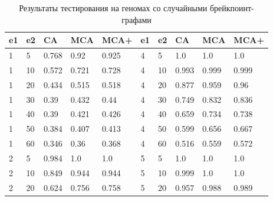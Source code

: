 \begin{table}[H]
\caption{Результаты тестирования на геномах со случайными брейкпоинт-графами}
\label{table:second_group}
\begin{tabular}{|l|l|l|l|l|lllll}
\hline
e1 & e2 & CA    & MCA   & MCA+  & \multicolumn{1}{l|}{e1} & \multicolumn{1}{l|}{e2} & \multicolumn{1}{l|}{CA}    & \multicolumn{1}{l|}{MCA}   & \multicolumn{1}{l|}{MCA+}  \\ \hline
1  & 5  & 0.768 & 0.92  & 0.925 & \multicolumn{1}{l|}{4}  & \multicolumn{1}{l|}{5}  & \multicolumn{1}{l|}{1.0}   & \multicolumn{1}{l|}{1.0}   & \multicolumn{1}{l|}{1.0}   \\ \hline
1  & 10 & 0.572 & 0.721 & 0.728 & \multicolumn{1}{l|}{4}  & \multicolumn{1}{l|}{10} & \multicolumn{1}{l|}{0.993} & \multicolumn{1}{l|}{0.999} & \multicolumn{1}{l|}{0.999} \\ \hline
1  & 20 & 0.434 & 0.515 & 0.518 & \multicolumn{1}{l|}{4}  & \multicolumn{1}{l|}{20} & \multicolumn{1}{l|}{0.877} & \multicolumn{1}{l|}{0.959} & \multicolumn{1}{l|}{0.96}  \\ \hline
1  & 30 & 0.39  & 0.432 & 0.44  & \multicolumn{1}{l|}{4}  & \multicolumn{1}{l|}{30} & \multicolumn{1}{l|}{0.749} & \multicolumn{1}{l|}{0.832} & \multicolumn{1}{l|}{0.836} \\ \hline
1  & 40 & 0.39  & 0.421 & 0.426 & \multicolumn{1}{l|}{4}  & \multicolumn{1}{l|}{40} & \multicolumn{1}{l|}{0.659} & \multicolumn{1}{l|}{0.734} & \multicolumn{1}{l|}{0.738} \\ \hline
1  & 50 & 0.384 & 0.407 & 0.413 & \multicolumn{1}{l|}{4}  & \multicolumn{1}{l|}{50} & \multicolumn{1}{l|}{0.599} & \multicolumn{1}{l|}{0.656} & \multicolumn{1}{l|}{0.667} \\ \hline
1  & 60 & 0.346 & 0.36  & 0.368 & \multicolumn{1}{l|}{4}  & \multicolumn{1}{l|}{60} & \multicolumn{1}{l|}{0.516} & \multicolumn{1}{l|}{0.559} & \multicolumn{1}{l|}{0.572} \\ \hline
2  & 5  & 0.984 & 1.0   & 1.0   & \multicolumn{1}{l|}{5}  & \multicolumn{1}{l|}{5}  & \multicolumn{1}{l|}{1.0}   & \multicolumn{1}{l|}{1.0}   & \multicolumn{1}{l|}{1.0}   \\ \hline
2  & 10 & 0.849 & 0.944 & 0.944 & \multicolumn{1}{l|}{5}  & \multicolumn{1}{l|}{10} & \multicolumn{1}{l|}{0.999} & \multicolumn{1}{l|}{1.0}   & \multicolumn{1}{l|}{1.0}   \\ \hline
2  & 20 & 0.624 & 0.756 & 0.758 & \multicolumn{1}{l|}{5}  & \multicolumn{1}{l|}{20} & \multicolumn{1}{l|}{0.957} & \multicolumn{1}{l|}{0.988} & \multicolumn{1}{l|}{0.989} \\ \hline

\end{tabular}
\end{table}
